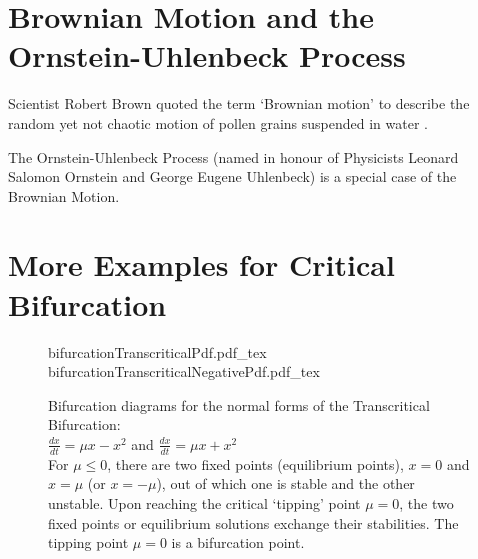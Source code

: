 \appendix
\section{Brownian Motion and the Ornstein-Uhlenbeck Process}
Scientist Robert Brown quoted the term `Brownian motion' to describe the random yet not chaotic motion of pollen grains suspended in water \cite{brownianMotion}.

The Ornstein-Uhlenbeck Process (named in honour of Physicists Leonard Salomon Ornstein and George Eugene Uhlenbeck) is a special case of the Brownian Motion.  

\section{More Examples for Critical Bifurcation}

\begin{figure}[!ht]
	\centering
		\centering
		{bifurcationTranscriticalPdf.pdf_tex}\quad
		{bifurcationTranscriticalNegativePdf.pdf_tex}
	\caption{Bifurcation diagrams for the normal forms of the Transcritical Bifurcation: \\$\frac{dx}{dt} = \mu x - x^2$ and $\frac{dx}{dt} = \mu x + x^2$ \\For $\mu \leq 0$, there are two fixed points (equilibrium points), $x=0$ and $x = \mu$ (or $x = -\mu$), out of which one is stable and the other unstable. Upon reaching the critical `tipping' point $\mu=0$, the two fixed points or equilibrium solutions exchange their stabilities. The tipping point $\mu=0$ is a bifurcation point.}
	\label{fig:bifTranscritical}
\end{figure}